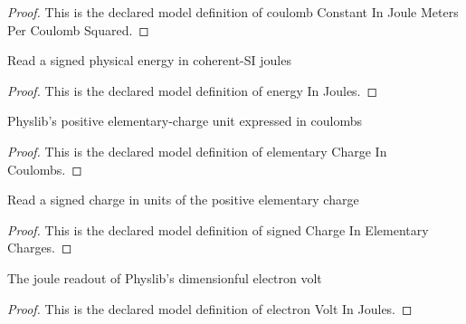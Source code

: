 \begin{proof}
  This is the declared model definition of coulomb Constant In Joule Meters Per Coulomb Squared.
\end{proof}
\begin{definition}
  \label{def:physics:phyx-mini-0636:phyxminiproblems-problemphyxmini0636-energyinjoules}
  Read a signed physical energy in coherent-SI joules
\end{definition}
\begin{proof}
  This is the declared model definition of energy In Joules.
\end{proof}
\begin{definition}
  \label{def:physics:phyx-mini-0636:phyxminiproblems-problemphyxmini0636-elementarychargeincoulombs}
  Physlib's positive elementary-charge unit expressed in coulombs
\end{definition}
\begin{proof}
  This is the declared model definition of elementary Charge In Coulombs.
\end{proof}
\begin{definition}
  \label{def:physics:phyx-mini-0636:phyxminiproblems-problemphyxmini0636-signedchargeinelementarycharges}
  Read a signed charge in units of the positive elementary charge
\end{definition}
\begin{proof}
  This is the declared model definition of signed Charge In Elementary Charges.
\end{proof}
\begin{definition}
  \label{def:physics:phyx-mini-0636:phyxminiproblems-problemphyxmini0636-electronvoltinjoules}
  The joule readout of Physlib's dimensionful electron volt
\end{definition}
\begin{proof}
  This is the declared model definition of electron Volt In Joules.
\end{proof}
